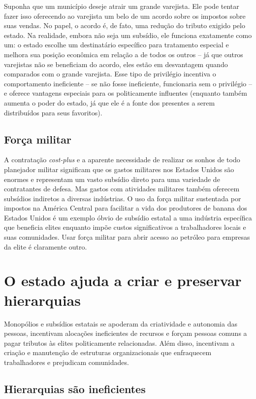 Suponha que um município deseje atrair um grande varejista. Ele pode tentar fazer isso oferecendo ao varejista um belo de um acordo sobre os impostos sobre suas vendas. No papel, o acordo é, de fato, uma redução do tributo exigido pelo estado. Na realidade, embora não seja um subsídio, ele funciona exatamente como um: o estado escolhe um destinatário específico para tratamento especial e melhora sua posição econômica em relação a de todos os outros -- já que outros varejistas não se beneficiam do acordo, eles estão em desvantagem quando comparados com o grande varejista. Esse tipo de privilégio incentiva o comportamento ineficiente -- se não fosse ineficiente, funcionaria sem o privilégio -- e oferece vantagens especiais para os politicamente influentes (enquanto também aumenta o poder do estado, já que ele é a fonte dos presentes a serem distribuídos para seus favoritos).

\subsection*{Força militar}

A contratação \emph{cost-plus} e a aparente necessidade de realizar os sonhos de todo planejador militar significam que os gastos militares nos Estados Unidos são enormes e representam um vasto subsídio direto para uma variedade de contratantes de defesa. Mas gastos com atividades militares também oferecem subsídios indiretos a diversas indústrias. O uso da força militar sustentada por impostos na América Central para facilitar a vida dos produtores de banana dos Estados Unidos é um exemplo óbvio de subsídio estatal a uma indústria específica que beneficia elites enquanto impõe custos significativos a trabalhadores locais e suas comunidades. Usar força militar para abrir acesso ao petróleo para empresas da elite é claramente outro.

\section{O estado ajuda a criar e preservar hierarquias}

Monopólios e subsídios estatais se apoderam da criatividade e autonomia das pessoas, incentivam alocações ineficientes de recursos e forçam pessoas comuns a pagar tributos às elites politicamente relacionadas. Além disso, incentivam a criação e manutenção de estruturas organizacionais que enfraquecem trabalhadores e prejudicam comunidades.

\subsection*{Hierarquias são ineficientes}


